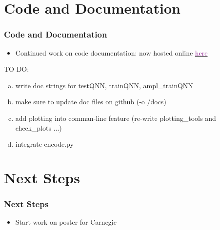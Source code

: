 \documentclass{beamer}
\begin{document}
\section{Code and Documentation}

\begin{frame}
\frametitle{Code and Documentation}
\begin{itemize}
\item Continued work on code documentation: now hosted online \href{https://david-f-amorim.github.io/PQC_function_evaluation/pqcprep.html}{\textcolor{purple}{here}}
\end{itemize}
TO DO:
\begin{enumerate}[(a)]
\item write doc strings for testQNN, trainQNN, ampl\_trainQNN 
\item make sure to update doc files on github (-o /docs)
\item add plotting into comman-line feature (re-write plotting\_tools and check\_plots ...) 
\item integrate encode.py
\end{enumerate}
\end{frame}

\section{Next Steps}

\begin{frame}
\frametitle{Next Steps}

\begin{itemize}
\item Start work on poster for Carnegie 
\end{itemize}

\end{frame}
\end{document}

